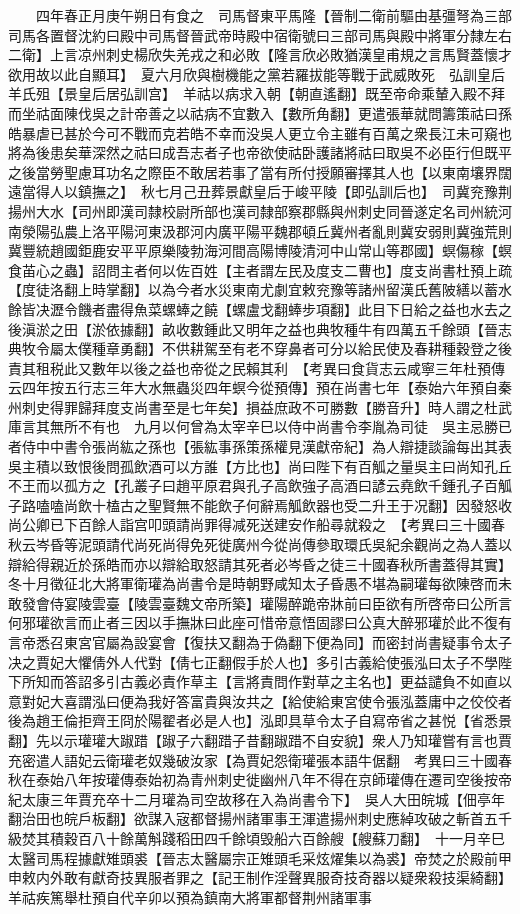 　　四年春正月庚午朔日有食之　司馬督東平馬隆【晉制二衛前驅由基彊弩為三部司馬各置督沈約曰殿中司馬督晉武帝時殿中宿衛號曰三部司馬與殿中將軍分隸左右二衛】上言凉州刺史楊欣失羌戎之和必敗【隆言欣必敗猶漢皇甫規之言馬賢蓋懷才欲用故以此自顯耳】　夏六月欣與樹機能之黨若羅拔能等戰于武威敗死　弘訓皇后羊氏殂【景皇后居弘訓宫】　羊祜以病求入朝【朝直遙翻】既至帝命乘輦入殿不拜而坐祜面陳伐吳之計帝善之以祜病不宜數入【數所角翻】更遣張華就問籌策祜曰孫皓暴虐已甚於今可不戰而克若皓不幸而没吳人更立令主雖有百萬之衆長江未可窺也將為後患矣華深然之祜曰成吾志者子也帝欲使祜卧護諸將祜曰取吳不必臣行但既平之後當勞聖慮耳功名之際臣不敢居若事了當有所付授願審擇其人也【以東南壤界闊遠當得人以鎮撫之】　秋七月己丑葬景獻皇后于峻平陵【即弘訓后也】　司冀兖豫荆揚州大水【司州即漢司隸校尉所部也漢司隸部察郡縣與州刺史同晉遂定名司州統河南滎陽弘農上洛平陽河東汲郡河内廣平陽平魏郡頓丘冀州者亂則冀安弱則冀強荒則冀豐統趙國鉅鹿安平平原樂陵勃海河間高陽博陵清河中山常山等郡國】螟傷稼【螟食苖心之蟲】詔問主者何以佐百姓【主者謂左民及度支二曹也】度支尚書杜預上疏【度徒洛翻上時掌翻】以為今者水災東南尤劇宜敕兖豫等諸州留漢氏舊陂繕以蓄水餘皆决瀝令饑者盡得魚菜螺蜯之饒【螺盧戈翻蜯步項翻】此目下日給之益也水去之後滇淤之田【淤依據翻】畝收數鍾此又明年之益也典牧種牛有四萬五千餘頭【晉志典牧令屬太僕種章勇翻】不供耕駕至有老不穿鼻者可分以給民使及春耕種穀登之後責其租税此又數年以後之益也帝從之民賴其利　【考異曰食貨志云咸寧三年杜預傳云四年按五行志三年大水無蟲災四年螟今從預傳】預在尚書七年【泰始六年預自秦州刺史得罪歸拜度支尚書至是七年矣】損益庶政不可勝數【勝音升】時人謂之杜武庫言其無所不有也　九月以何曾為太宰辛巳以侍中尚書令李胤為司徒　吳主忌勝已者侍中中書令張尚紘之孫也【張紘事孫策孫權見漢獻帝紀】為人辯捷談論每出其表吳主積以致恨後問孤飲酒可以方誰【方比也】尚曰陛下有百觚之量吳主曰尚知孔丘不王而以孤方之【孔叢子曰趙平原君與孔子高飲強子高酒曰諺云堯飲千鍾孔子百觚子路嗑嗑尚飲十榼古之聖賢無不能飲子何辭焉觚飲器也受二升王于况翻】因發怒收尚公卿已下百餘人詣宫叩頭請尚罪得减死送建安作船尋就殺之　【考異曰三十國春秋云岑昏等泥頭請代尚死尚得免死徙廣州今從尚傳參取環氏吳紀余觀尚之為人蓋以辯給得親近於孫皓而亦以辯給取怒請其死者必岑昏之徒三十國春秋所書蓋得其實】　冬十月徵征北大將軍衛瓘為尚書令是時朝野咸知太子昏愚不堪為嗣瓘每欲陳啓而未敢發會侍宴陵雲臺【陵雲臺魏文帝所築】瓘陽醉跪帝牀前曰臣欲有所啓帝曰公所言何邪瓘欲言而止者三因以手撫牀曰此座可惜帝意悟固謬曰公真大醉邪瓘於此不復有言帝悉召東宮官屬為設宴會【復扶又翻為于偽翻下便為同】而密封尚書疑事令太子决之賈妃大懼倩外人代對【倩七正翻假手於人也】多引古義給使張泓曰太子不學陛下所知而答詔多引古義必責作草主【言將責問作對草之主名也】更益譴負不如直以意對妃大喜謂泓曰便為我好答富貴與汝共之【給使給東宮使令張泓蓋庸中之佼佼者後為趙王倫拒齊王冏於陽翟者必是人也】泓即具草令太子自寫帝省之甚悦【省悉景翻】先以示瓘瓘大踧踖【踧子六翻踖子昔翻踧踖不自安貌】衆人乃知瓘嘗有言也賈充密遣人語妃云衛瓘老奴幾破汝家【為賈妃怨衛瓘張本語牛倨翻　考異曰三十國春秋在泰始八年按瓘傳泰始初為青州刺史徙幽州八年不得在京師瓘傳在遷司空後按帝紀太康三年賈充卒十二月瓘為司空故移在入為尚書令下】　吳人大田皖城【佃亭年翻治田也皖戶板翻】欲謀入宼都督揚州諸軍事王渾遣揚州刺史應綽攻破之斬首五千級焚其積穀百八十餘萬斛踐稻田四千餘頃毁船六百餘艘【艘蘇刀翻】　十一月辛巳太醫司馬程據獻雉頭裘【晉志太醫屬宗正雉頭毛采炫燿集以為裘】帝焚之於殿前甲申敕内外敢有獻奇技異服者罪之【記王制作淫聲異服奇技奇器以疑衆殺技渠綺翻】　羊祜疾篤舉杜預自代辛卯以預為鎮南大將軍都督荆州諸軍事
